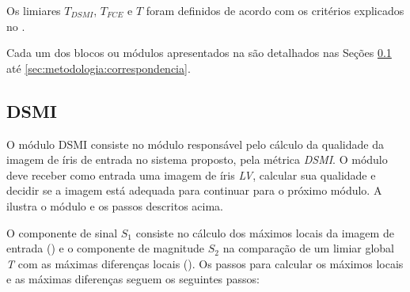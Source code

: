 \par Os limiares $T_{DSMI}$, $T_{FCE}$ e $T$ foram definidos de acordo com os critérios explicados no .

Cada um dos blocos ou módulos apresentados na  são detalhados nas Seções \ref{sec:metodologia:dsmi} até \ref{sec:metodologia:correspondencia}.


\subsection{DSMI}\label{sec:metodologia:dsmi}

\par O módulo \acrshort{DSMI} consiste no módulo responsável pelo cálculo da qualidade da imagem de íris de entrada no sistema proposto, pela métrica \textit{\acrshort{DSMI}}. O módulo deve receber como entrada uma imagem de íris \textit{\acrshort{LV}}, calcular sua qualidade e decidir se a imagem está adequada para continuar para o próximo módulo. A  ilustra o módulo e os passos descritos acima.



\par O componente de sinal $S_{1}$ consiste no cálculo dos máximos locais da imagem de entrada () e o componente de magnitude $S_{2}$ na comparação de um limiar global \textit{T} com as máximas diferenças locais (). Os passos para calcular os máximos locais e as máximas diferenças seguem os seguintes passos:

